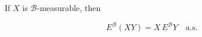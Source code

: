 If $X$ is $\mathcal{B}$-measurable, then

$$
E^{\mathcal{B}}(XY) = X \, E^{\mathcal{B}}Y \quad \text{a.s.}
$$

